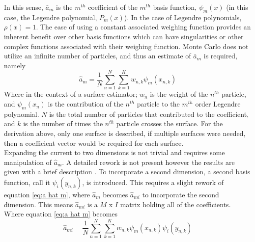 \documentclass[10tma4paper]{article}
\begin{document}
In this sense, $\bar{a}_m$ is the $m^{th}$ coefficient of the $m^{th}$ basis function, $\psi_{m}(x)$ (in this case, the Legendre polynomial, $P_{m}(x)$). In the case of Legendre polynomials, $\rho(x)=1$. The ease of using a constant associated weighing function provides an inherent benefit over other basis functions which can have singularities or other complex functions associated with their weighing function. Monte Carlo does not utilize an infinite number of particles, and thus an estimate of $\bar{a}_{m}$ is required, namely
	 \begin{equation} \label{eq:a hat m}
	 \hat{a}_{m}=\frac{1}{N}\sum_{n=1}^{N}\sum_{k=1}^{K}w_{n,k}\psi_{m}(x_{n,k})
	 \end{equation}
Where in the context of a surface estimator; $w_{n}$ is the weight of the $n^{th}$ particle, and $\psi_{m}(x_{n})$ is the contribution of the $n^{th}$ particle to the $m^{th}$ order Legendre polynomial. $N$ is the total number of particles that contributed to the coefficient, and $k$ is the number of times the $n^{th}$ particle crosses the surface. For the derivation above, only one surface is described, if multiple surfaces were needed, then a coefficient vector would be required for each surface.
\\
Expanding the current to two dimensions is not trivial and requires some manipulation of $\hat{a}_m$. A detailed rework is not present however the results are given with a brief description \cite{2DFET}. To incorporate a second dimension, a second basis function, call it $\psi_i(y_{n,k})$, is introduced. This requires a slight rework of equation \eqref{eq:a hat m}, where $\hat{a}_{m}$ becomes $\hat{a}_{mi}$ to incorporate the second dimension. This means $\hat{a}_{mi}$ is a $M$ x $I$ matrix holding all of the coefficients. Where equation \eqref{eq:a hat m} becomes
	 \begin{equation} \label{eq:a hat m i}
	 \hat{a}_{mi}=\frac{1}{N}\sum_{n=1}^{N}\sum_{k=1}^{K}w_{n,k}\psi_{m}(x_{n,k})\psi_{i}(y_{n,k})
	 \end{equation}
\end{document}
